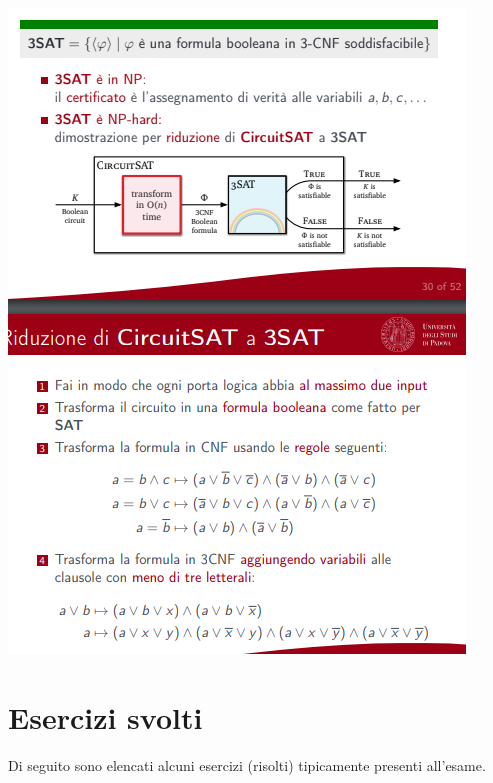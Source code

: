 \documentclass[]{article}
\begin{document}
\begin{center}
				\includegraphics[scale=0.8]{NP10.png}
			\end{center}
	\section{Esercizi svolti}
	 	Di seguito sono elencati alcuni esercizi (risolti) tipicamente presenti all'esame.
		
		
		
		
		
		
		
\end{document}
